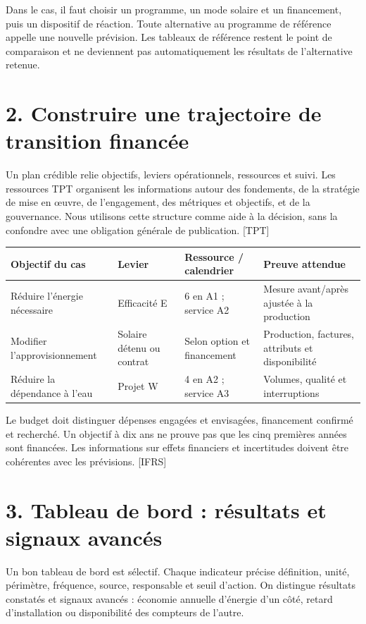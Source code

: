 \documentclass[12pt,a4paper]{article}
\begin{document}
Dans le cas, il faut choisir un programme, un mode solaire et un financement, puis un dispositif de réaction. Toute alternative au programme de référence appelle une nouvelle prévision. Les tableaux de référence restent le point de comparaison et ne deviennent pas automatiquement les résultats de l’alternative retenue.

\section*{2. Construire une trajectoire de transition financée}
Un plan crédible relie objectifs, leviers opérationnels, ressources et suivi. Les ressources TPT organisent les informations autour des fondements, de la stratégie de mise en œuvre, de l’engagement, des métriques et objectifs, et de la gouvernance. Nous utilisons cette structure comme aide à la décision, sans la confondre avec une obligation générale de publication. [TPT]



\Needspace{180pt}
\begin{longtable}{p{3.67cm}p{3.67cm}p{3.67cm}p{3.67cm}}
\toprule
Objectif du cas & Levier & Ressource / calendrier & Preuve attendue \\
\midrule\endhead
Réduire l’énergie nécessaire & Efficacité E & 6 en A1 ; service A2 & Mesure avant/après ajustée à la production \\
Modifier l’approvisionnement & Solaire détenu ou contrat & Selon option et financement & Production, factures, attributs et disponibilité \\
Réduire la dépendance à l’eau & Projet W & 4 en A2 ; service A3 & Volumes, qualité et interruptions \\
\bottomrule
\end{longtable}

Le budget doit distinguer dépenses engagées et envisagées, financement confirmé et recherché. Un objectif à dix ans ne prouve pas que les cinq premières années sont financées. Les informations sur effets financiers et incertitudes doivent être cohérentes avec les prévisions. [IFRS]

\section*{3. Tableau de bord : résultats et signaux avancés}
Un bon tableau de bord est sélectif. Chaque indicateur précise définition, unité, périmètre, fréquence, source, responsable et seuil d’action. On distingue résultats constatés et signaux avancés : économie annuelle d’énergie d’un côté, retard d’installation ou disponibilité des compteurs de l’autre.
\end{document}
